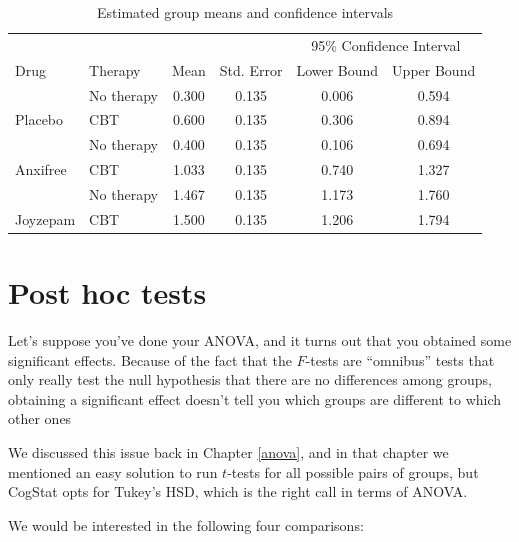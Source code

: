 \documentclass[
]{book}
\theoremstyle{definition}
\theoremstyle{definition}
\theoremstyle{definition}
\theoremstyle{definition}
\theoremstyle{remark}
\begin{document}
\begin{table}[!h]

\caption{\label{tab:unnamed-chunk-86}Estimated group means and confidence intervals}
\centering
\begin{tabular}[t]{llcccc}
\toprule
\multicolumn{1}{c}{ } & \multicolumn{1}{c}{ } & \multicolumn{1}{c}{ } & \multicolumn{1}{c}{ } & \multicolumn{2}{c}{95\% Confidence Interval} \\
\cmidrule(l{3pt}r{3pt}){5-6}
Drug & Therapy & Mean & Std. Error & Lower Bound & Upper Bound\\
\midrule
 & No therapy & 0.300 & 0.135 & 0.006 & 0.594\\

\multirow{-2}{*}{\raggedright\arraybackslash Placebo} & CBT & 0.600 & 0.135 & 0.306 & 0.894\\
\cmidrule{1-6}
 & No therapy & 0.400 & 0.135 & 0.106 & 0.694\\

\multirow{-2}{*}{\raggedright\arraybackslash Anxifree} & CBT & 1.033 & 0.135 & 0.740 & 1.327\\
\cmidrule{1-6}
 & No therapy & 1.467 & 0.135 & 1.173 & 1.760\\

\multirow{-2}{*}{\raggedright\arraybackslash Joyzepam} & CBT & 1.500 & 0.135 & 1.206 & 1.794\\
\bottomrule
\end{tabular}
\end{table}

\hypertarget{posthoc2}{%
\section{Post hoc tests}\label{posthoc2}}

Let's suppose you've done your ANOVA, and it turns out that you obtained some significant effects. Because of the fact that the \(F\)-tests are ``omnibus'' tests that only really test the null hypothesis that there are no differences among groups, obtaining a significant effect doesn't tell you which groups are different to which other ones

We discussed this issue back in Chapter \ref{anova}, and in that chapter we mentioned an easy solution to run \(t\)-tests for all possible pairs of groups, but CogStat opts for Tukey's HSD, which is the right call in terms of ANOVA.

We would be interested in the following four comparisons:
\end{document}
